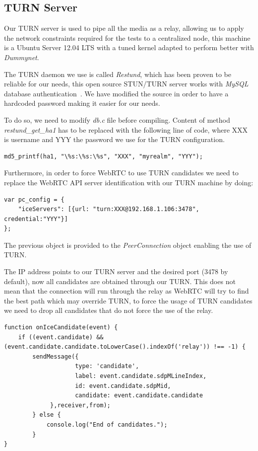 \subsection{TURN Server}

Our TURN server is used to pipe all the media as a relay, allowing us to apply the network constraints required for the tests to a centralized node, this machine is a Ubuntu Server 12.04 LTS with a tuned kernel adapted to perform better with {\it Dummynet}.

The TURN daemon we use is called {\it Restund}, which has been proven to be reliable for our needs, this open source STUN/TURN server works with {\it MySQL} database authentication~\cite{restund}. We have modified the source in order to have a hardcoded password making it easier for our needs.

To do so, we need to modify {\it db.c} file before compiling. Content of  method {\it restund\_get\_ha1} has to be replaced with the following line of code, where XXX is username and YYY the password we use for the TURN configuration.

\lstset{language=C}
\begin{lstlisting}[caption=Forcing a hardcoded password in our TURN server]
md5_printf(ha1, "\%s:\%s:\%s", "XXX", "myrealm", "YYY");
\end{lstlisting}

Furthermore, in order to force WebRTC to use TURN candidates we need to replace the WebRTC API server identification with our TURN machine by doing:

\lstset{language=JavaScript}
\begin{lstlisting}[caption=Configuring our TURN server in WebRTC]
var pc_config = {
	"iceServers": [{url: "turn:XXX@192.168.1.106:3478", credential:"YYY"}]
};
\end{lstlisting}

The previous object is provided to the {\it PeerConnection} object enabling the use of TURN.

The IP address points to our TURN server and the desired port (3478 by default), now all candidates are obtained through our TURN. This does not mean that the connection will run through the relay as WebRTC will try to find the best path which may override TURN, to force the usage of TURN candidates we need to drop all candidates that do not force the use of the relay.

\lstset{language=JavaScript}
\begin{lstlisting}[caption=Dropping all candidates except relay]
function onIceCandidate(event) {
	if ((event.candidate) && (event.candidate.candidate.toLowerCase().indexOf('relay')) !== -1) {
		sendMessage({
               		type: 'candidate',
               		label: event.candidate.sdpMLineIndex,
               		id: event.candidate.sdpMid,
               		candidate: event.candidate.candidate
          	 },receiver,from);
       	} else {
           	console.log("End of candidates.");
       	}
}
\end{lstlisting}


